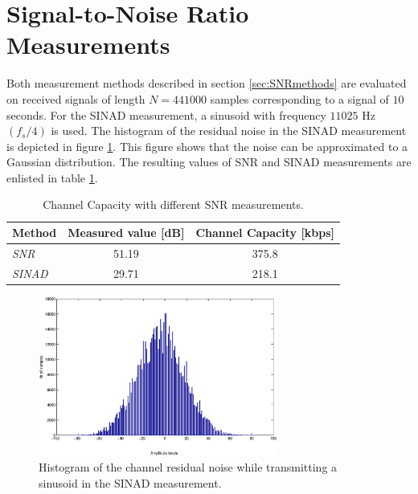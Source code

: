 \documentclass[12pt,a4paper,openright]{report}
\begin{document}
\section{Signal-to-Noise Ratio Measurements}

Both measurement methods described in section \ref{sec:SNRmethods} are evaluated on received signals of length \(N = 441000\) samples corresponding to a signal of \(10\) seconds. For the SINAD measurement, a sinusoid with frequency \(11025\) Hz \((f_s/4)\) is used. The histogram of the residual noise in the SINAD measurement is depicted in figure \ref{fig:noise_histogram}. This figure shows that the noise can be approximated to a Gaussian distribution. The resulting values of SNR and SINAD measurements are enlisted in table \ref{table:snr}.


\begin{table} [h]
\centering
\begin{tabular}{lcc} 
\hline
\bf{Method}	& \bf{Measured value }\textnormal{[dB]}    & \bf{Channel Capacity }\textnormal{[kbps]} \\
\hline
\emph{SNR}          & 51.19            & 375.8       \\  
\emph{SINAD}        & 29.71            & 218.1       \\   
\hline
\end{tabular}
\caption[Channel Capacity with different SNR measurements]{Channel Capacity with different SNR measurements.}
\label{table:snr}
\end{table}


\begin{figure}[H]
  \centering
    \includegraphics[width=0.7\textwidth]{snr_noise_histogram.eps}
    \caption[Histogram of the channel residual noise.]{Histogram of the channel residual noise while transmitting a sinusoid in the SINAD measurement.}
    \label{fig:noise_histogram}
\end{figure}
\end{document}
